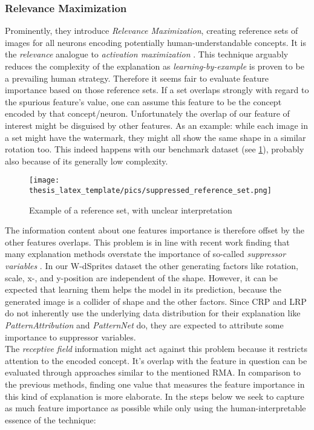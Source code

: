 \subsubsection{Relevance Maximization}
Prominently, they introduce \textit{Relevance Maximization}, creating reference sets of images for all neurons encoding potentially human-understandable concepts. It is the \textit{relevance} analogue to \textit{activation maximization} \cite{Nguyen2016}. This technique arguably reduces the complexity of the explanation as \textit{learning-by-example} is proven to be a prevailing human strategy.
Therefore it seems fair to evaluate feature importance based on those reference sets. If a set overlaps strongly with regard to the spurious feature's value, one can assume this feature to be the concept encoded by that concept/neuron. 
Unfortunately the overlap of our feature of interest might be disguised by other features. As an example: while each image in a set might have the watermark, they might all show the same shape in a similar rotation too. This indeed happens with our benchmark dataset (see \cref{fig:suppressor_ref}), probably also because of its generally low complexity. 

\begin{figure}
    \centering
    \texttt{[image: thesis\_latex\_template/pics/suppressed\_reference\_set.png]}
    \caption[Reference Set Interpretation]{Example of a reference set, with unclear interpretation}
    \label{fig:suppressor_ref}
\end{figure}

The information content about one features importance is therefore offset by the other features overlaps. This problem is in line with recent work finding that many explanation methods overstate the importance of so-called \textit{suppressor variables} \cite{Wilming2023,Clark2023}. In our W-dSprites dataset the other generating factors like rotation, scale, x-, and y-position are independent of the shape. However, it can be expected that learning them helps the model in its prediction, because the generated image is a collider of shape and the other factors. Since CRP and LRP do not inherently use the underlying data distribution for their explanation like \textit{PatternAttribution} and \textit{PatternNet} do, they are expected to attribute some importance to suppressor variables. \\

The \textit{receptive field} information might act against this problem because it restricts attention to the encoded concept. It's overlap with the feature in question can be evaluated through approaches similar to the mentioned RMA. 
In comparison to the previous methods, finding one value that measures the feature importance in this kind of explanation is more elaborate. In the steps below we seek to capture as much feature importance as possible while only using the human-interpretable essence of the technique:

